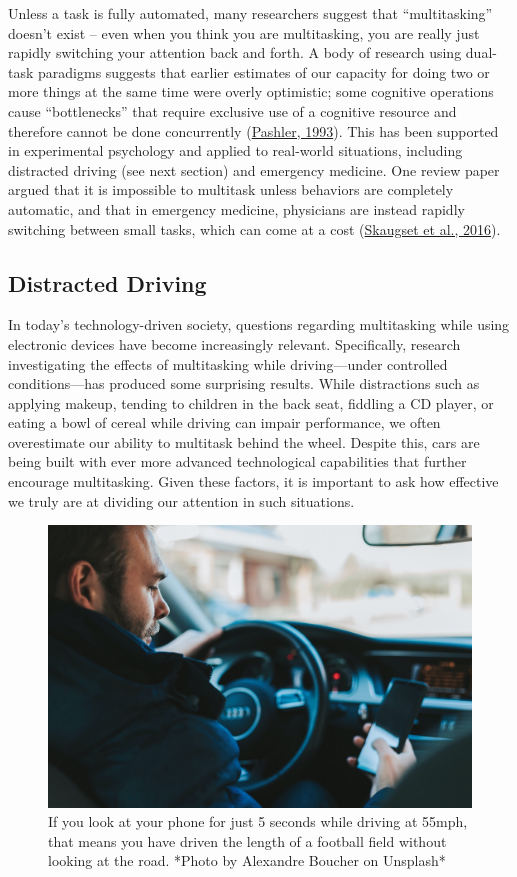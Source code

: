 \documentclass[
]{krantz}
\begin{document}
Unless a task is fully automated, many researchers suggest that ``multitasking'' doesn't exist -- even when you think you are multitasking, you are really just rapidly switching your attention back and forth. A body of research using dual-task paradigms suggests that earlier estimates of our capacity for doing two or more things at the same time were overly optimistic; some cognitive operations cause ``bottlenecks'' that require exclusive use of a cognitive resource and therefore cannot be done concurrently (\protect\hyperlink{ref-Pashler1993}{Pashler, 1993}). This has been supported in experimental psychology and applied to real-world situations, including distracted driving (see next section) and emergency medicine. One review paper argued that it is impossible to multitask unless behaviors are completely automatic, and that in emergency medicine, physicians are instead rapidly switching between small tasks, which can come at a cost (\protect\hyperlink{ref-Skaugset2016}{Skaugset et al., 2016}).

\hypertarget{distracted-driving}{%
\subsection*{Distracted Driving}\label{distracted-driving}}


In today's technology-driven society, questions regarding multitasking while using electronic devices have become increasingly relevant. Specifically, research investigating the effects of multitasking while driving---under controlled conditions---has produced some surprising results. While distractions such as applying makeup, tending to children in the back seat, fiddling a CD player, or eating a bowl of cereal while driving can impair performance, we often overestimate our ability to multitask behind the wheel. Despite this, cars are being built with ever more advanced technological capabilities that further encourage multitasking. Given these factors, it is important to ask how effective we truly are at dividing our attention in such situations.

\begin{figure}

{\centering \includegraphics[width=0.5\linewidth]{images/3_attention/driving} 

}

\caption{If you look at your phone for just 5 seconds while driving at 55mph, that means you have driven the length of a football field without looking at the road. *Photo by Alexandre Boucher on Unsplash*}\label{fig:driving}
\end{figure}
\end{document}
